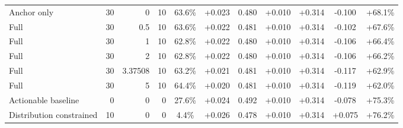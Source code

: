 \begin{table}[htbp]
\begin{tabular}{lrrrccccccc}
Anchor only & 30 & 0 & 10 & 63.6\% & +0.023 & 0.480 & +0.010 & +0.314 & -0.100 & +68.1\% \\
Full & 30 & 0.5 & 10 & 63.6\% & +0.022 & 0.481 & +0.010 & +0.314 & -0.102 & +67.6\% \\
Full & 30 & 1 & 10 & 62.8\% & +0.022 & 0.480 & +0.010 & +0.314 & -0.106 & +66.4\% \\
Full & 30 & 2 & 10 & 62.8\% & +0.022 & 0.480 & +0.010 & +0.314 & -0.106 & +66.2\% \\
Full & 30 & 3.37508 & 10 & 63.2\% & +0.021 & 0.481 & +0.010 & +0.314 & -0.117 & +62.9\% \\
Full & 30 & 5 & 10 & 64.4\% & +0.020 & 0.481 & +0.010 & +0.314 & -0.119 & +62.0\% \\
Actionable baseline & 0 & 0 & 0 & 27.6\% & +0.024 & 0.492 & +0.010 & +0.314 & -0.078 & +75.3\% \\
Distribution constrained & 10 & 0 & 0 & 4.4\% & +0.026 & 0.478 & +0.010 & +0.314 & +0.075 & +76.2\% \\
\bottomrule
\end{tabular}
\end{table}